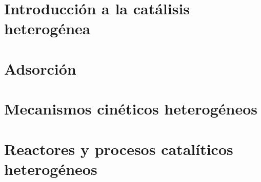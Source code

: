 \documentclass[10pt, letterpaper]{article}
\begin{document}
    \section{Introducción a la catálisis heterogénea}

    \section{Adsorción}

    \section{Mecanismos cinéticos heterogéneos}

    \section{Reactores y procesos catalíticos heterogéneos}
    
\end{document}
